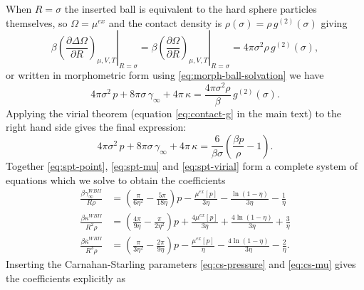 \documentclass[11pt]{report}
\begin{document}
When $R = \sigma$ the inserted ball is equivalent to the hard sphere particles themselves, so $\Omega = \mu^{ex}$ and the contact density is $\rho(\sigma) = \rho \, g^{(2)}(\sigma)$ giving
\begin{equation}\label{eq:spt-contact-density}
  \left. \beta \left( \frac{\partial \Delta \Omega}{\partial R} \right)_{\mu,V,T}
  \right|_{R = \sigma}
  =
  \left. \beta \left( \frac{\partial \Omega}{\partial R} \right)_{\mu,V,T}
  \right|_{R = \sigma}
  =
  4\pi \sigma^2 \rho \, g^{(2)}(\sigma),
\end{equation}
or written in morphometric form using \eqref{eq:morph-ball-solvation} we have
\begin{equation}
  4\pi \sigma^2 \, p +
  8\pi \sigma \, \gamma_\infty +
  4\pi \, \kappa =
  \frac{4\pi \sigma^2 \rho}{\beta} \, g^{(2)}(\sigma).
\end{equation}
Applying the virial theorem (equation \eqref{eq:contact-g} in the main text) to the right hand side gives the final expression:
\begin{equation}\label{eq:spt-virial}
  4\pi \sigma^2 \, p +
  8\pi \sigma \, \gamma_\infty +
  4\pi \, \kappa =
  \frac{6}{\beta\sigma} \left( \frac{\beta p}{\rho} - 1 \right).
\end{equation}
Together \eqref{eq:spt-point}, \eqref{eq:spt-mu} and \eqref{eq:spt-virial} form a complete system of equations which we solve to obtain the coefficients
\begin{subequations}
  \begin{align}
    \frac{\beta \gamma_\infty^{WBII}}{R \rho} &=
    \left(\frac{\pi}{6\eta^2} - \frac{5\pi}{18\eta}\right) p -
    \frac{\mu^{ex}[p]}{3\eta} -
    \frac{\ln{(1-\eta)}}{3\eta} -
    \frac{1}{\eta}
    \label{eq:spt-gamma}
    \\
    \frac{\beta \kappa^{WBII}}{R^2\rho} &=
    \left( \frac{4\pi}{9\eta} - \frac{\pi}{2\eta^2} \right) p +
    \frac{4\mu^{ex}[p]}{3\eta} + \frac{4\ln{(1-\eta)}}{3\eta} + \frac{3}{\eta}
    \\
    \frac{\beta \overline{\kappa}^{WBII}}{R^3\rho} &=
    \left( \frac{\pi}{3\eta^2} - \frac{2\pi}{9\eta} \right) p -
    \frac{\mu^{ex}[p]}{\eta} - \frac{4\ln{(1-\eta)}}{3\eta} - \frac{2}{\eta}.
  \end{align}
\end{subequations}
Inserting the Carnahan-Starling parameters \eqref{eq:cs-pressure} and \eqref{eq:cs-mu} gives the coefficients explicitly as
\end{document}
